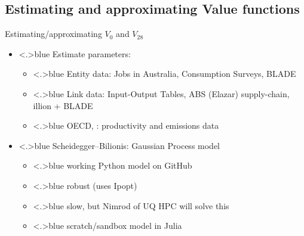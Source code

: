 \documentclass[handout,english]{beamer}
\begin{document}
\subsection{Estimating and approximating Value functions}
\begin{frame}
  {Estimating/approximating $V_0$ and $V_{28}$}
  \begin{itemize}
    \item<+-|alert@+>{\color<.>{blue}
          Estimate parameters:
          }
          \begin{itemize}
              \item<+-|alert@+>{\color<.>{blue}
                  Entity data: Jobs in Australia, Consumption Surveys, BLADE
                  }
              \item<+-|alert@+>{\color<.>{blue}
                  Link data: Input-Output Tables, ABS (Elazar) supply-chain, illion + BLADE
                  }
              \item<+-|alert@+>{\color<.>{blue}
                  OECD, \etc : productivity and emissions data
                  }
          \end{itemize}
  \end{itemize}
\begin{itemize}
        \item<+-|alert@+>{\color<.>{blue}
        Scheidegger--Bilionis: Gaussian Process model
        \begin{itemize}
          \item<+-|alert@+>{\color<.>{blue}
               working Python model on GitHub
                }
          \item<+-|alert@+>{\color<.>{blue}
               robust (uses Ipopt)
                }
          \item<+-|alert@+>{\color<.>{blue}
                slow, but Nimrod of UQ HPC will solve this
                }
          \item<+-|alert@+>{\color<.>{blue}
                scratch/sandbox model in Julia
                }
          \end{itemize}
        }
        \end{itemize}
\end{frame}
\end{document}
